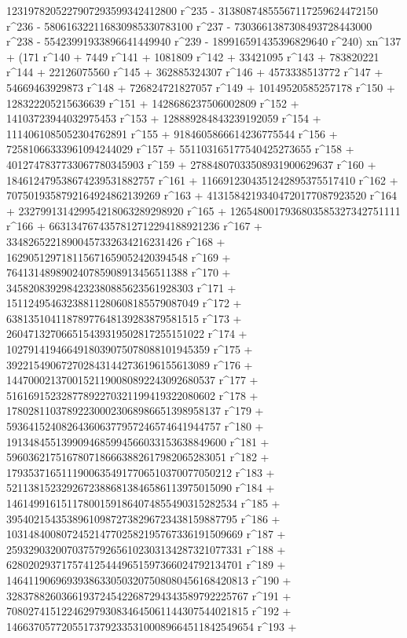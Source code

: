       1231978205227907293599342412800 r^235 - 
       31380874855567117259624472150 r^236 - 
       580616322116830985330783100 r^237 - 
       7303661387308493728443000 r^238 - 
       55423991933896641449940 r^239 - 
       189916591435396829640 r^240) xn^137 + (171 r^140 + 
       7449 r^141 + 1081809 r^142 + 33421095 r^143 + 
       783820221 r^144 + 22126075560 r^145 + 362885324307 r^146 + 
       4573338513772 r^147 + 54669463929873 r^148 + 
       726824721827057 r^149 + 10149520585257178 r^150 + 
       128322205215636639 r^151 + 1428686237506002809 r^152 + 
       14103723944032975453 r^153 + 128889284843239192059 r^154 + 
       1114061085052304762891 r^155 + 9184605866614236775544 r^156 + 
       72581066333961094244029 r^157 + 
       551103165177540425273655 r^158 + 
       4012747837733067780345903 r^159 + 
       27884807033508931900629637 r^160 + 
       184612479538674239531882757 r^161 + 
       1166912304351242895375517410 r^162 + 
       7075019358792164924862139269 r^163 + 
       41315842193404720177087923520 r^164 + 
       232799131429954218063289298920 r^165 + 
       1265480017936803585327342751111 r^166 + 
       6631347674357812712294188921236 r^167 + 
       33482652218900457332634216231426 r^168 + 
       162905129718115671659052420394548 r^169 + 
       764131489890240785908913456511388 r^170 + 
       3458208392984232380885623561928303 r^171 + 
       15112495463238811280608185579087049 r^172 + 
       63813510411878977648139283879581515 r^173 + 
       260471327066515439319502817255151022 r^174 + 
       1027914194664918039075078088101945359 r^175 + 
       3922154906727028431442736196155613089 r^176 + 
       14470002137001521190080892243092680537 r^177 + 
       51616915232877892270321199419322080602 r^178 + 
       178028110378922300023068986651398958137 r^179 + 
       593641524082643606377957246574641944757 r^180 + 
       1913484551399094685994566033153638849600 r^181 + 
       5960362175167807186663882617982065283051 r^182 + 
       17935371651119006354917706510370077050212 r^183 + 
       52113815232926723886813846586113975015090 r^184 + 
       146149916151178001591864074855490315282534 r^185 + 
       395402154353896109872738296723438159887795 r^186 + 
       1031484008072452147702582195767336191509669 r^187 + 
       2593290320070375792656102303134287321077331 r^188 + 
       6280202937175741254449651597366024792134701 r^189 + 
       14641190696939386330503207508080456168420813 r^190 + 
       32837882603661937245422687294343589792225767 r^191 + 
       70802741512246297930834645061144307544021815 r^192 + 
       146637057720551737923353100089664511842549654 r^193 + 
